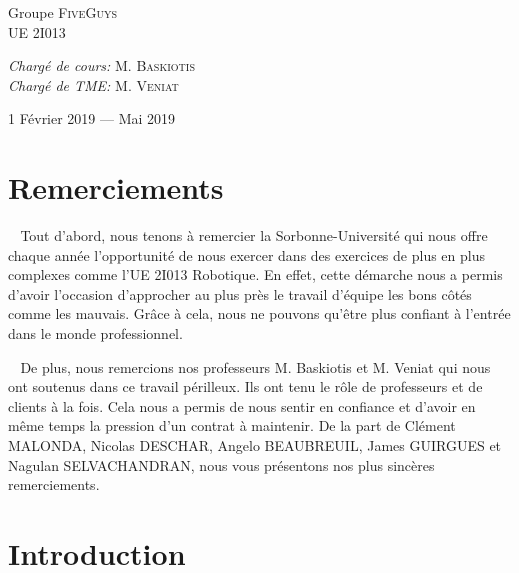 \documentclass[12pt]{article}
\def\tab{$\>\>\>\>$}
\begin{document}
\begin{titlepage}
\begin{sffamily}
\begin{center}
    \begin{minipage}{0.4\textwidth}
      \begin{flushleft} \large
        Groupe \textsc{FiveGuys}\\
        UE 2I013\\
      \end{flushleft}
    \end{minipage}
    \begin{minipage}{0.4\textwidth}
      \begin{flushright} \large
        \emph{Chargé de cours:} M. \textsc{Baskiotis}\\
        \emph{Chargé de TME:} M. \textsc{Veniat}
      \end{flushright}
    \end{minipage}

    \vfill

    {\large 1\ier{} Février 2019 — Mai 2019}

  \end{center}
  \end{sffamily}
\end{titlepage}

\tableofcontents
\newpage

\section{Remerciements}
\tab Tout d’abord, nous tenons à remercier la Sorbonne-Université qui nous offre chaque année l’opportunité de nous exercer dans des exercices de plus en plus complexes comme l’UE 2I013 Robotique. En effet, cette démarche nous a permis d’avoir l’occasion d’approcher au plus près le travail d’équipe les bons côtés comme les mauvais. Grâce à cela, nous ne pouvons qu’être plus confiant à l’entrée dans le monde professionnel.

\tab De plus, nous remercions nos professeurs M. Baskiotis et M. Veniat qui nous ont soutenus dans ce travail périlleux. Ils ont tenu le rôle de professeurs et de clients à la fois. Cela nous a permis de nous sentir en confiance et d’avoir en même temps la pression d’un contrat à maintenir.
De la part de Clément MALONDA, Nicolas DESCHAR, Angelo BEAUBREUIL, James GUIRGUES et Nagulan SELVACHANDRAN, nous vous présentons nos plus sincères remerciements.
\newpage

\section{Introduction}
\end{document}
